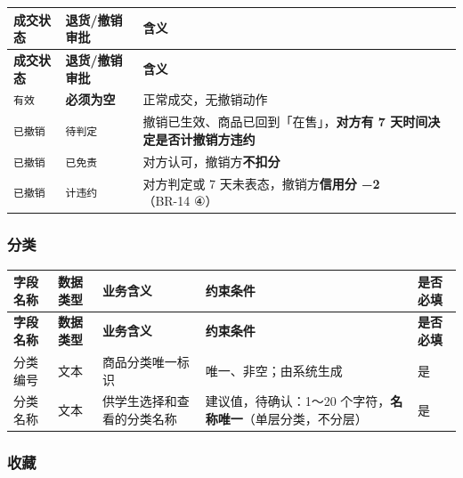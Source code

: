 \documentclass[12pt,a4paper]{ctexart}
\begin{document}
{\footnotesize
\begin{longtable}{|p{2.27cm}|p{3.22cm}|p{10.50cm}|}
\hline
\textbf{成交状态} & \textbf{退货/撤销审批} & \textbf{含义} \\
\hline
\endfirsthead
\hline
\textbf{成交状态} & \textbf{退货/撤销审批} & \textbf{含义} \\
\hline
\endhead
\hline
\endfoot
\texttt{有效} & \textbf{必须为空} & 正常成交，无撤销动作 \\
\hline
\texttt{已撤销} & \texttt{待判定} & 撤销已生效、商品已回到「在售」，\textbf{对方有 7 天时间决定是否计撤销方违约} \\
\hline
\texttt{已撤销} & \texttt{已免责} & 对方认可，撤销方\textbf{不扣分} \\
\hline
\texttt{已撤销} & \texttt{计违约} & 对方判定或 7 天未表态，撤销方\textbf{信用分 −2}（BR-14 ④） \\
\hline
\end{longtable}
}


\subsubsection*{分类}

{\footnotesize
\begin{longtable}{|p{1.68cm}|p{1.68cm}|p{3.94cm}|p{7.01cm}|p{1.68cm}|}
\hline
\textbf{字段名称} & \textbf{数据类型} & \textbf{业务含义} & \textbf{约束条件} & \textbf{是否必填} \\
\hline
\endfirsthead
\hline
\textbf{字段名称} & \textbf{数据类型} & \textbf{业务含义} & \textbf{约束条件} & \textbf{是否必填} \\
\hline
\endhead
\hline
\endfoot
分类编号 & 文本 & 商品分类唯一标识 & 唯一、非空；由系统生成 & 是 \\
\hline
分类名称 & 文本 & 供学生选择和查看的分类名称 & 建议值，待确认：1～20 个字符，\textbf{名称唯一}（单层分类，不分层） & 是 \\
\hline
\end{longtable}
}


\subsubsection*{收藏}
\end{document}
